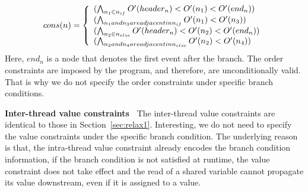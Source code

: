 \[ cons(n) = \left\{ 
  \begin{array}{l l}
  (\bigwedge_{n_1\in n_{if}}{O'(header_n)<O'(n_1)<O'(end_n)}) \\
   (\bigwedge_{n_1 and n_3 are adjacent in n_{if}}{O'(n_1)<O'(n_3)}) \\
   (\bigwedge_{n_2\in n_{else}}{O'(header_n)<O'(n_2)<O'(end_n)}) \\
    (\bigwedge_{n_2 and n_4 are adjacent in n_{else}}{O'(n_2)<O'(n_4)}) \\
  \end{array} \right.\]
Here, $end_n$ is a node that denotes the first event after the branch.  The order constraints are imposed by the program, and therefore, are unconditionally valid. That is why we do not specify the order constraints under specific branch conditions. 

{\bf Inter-thread value constraints\ } The inter-thread value constraints are identical to those in Section~\ref{sec:relax1}. Interesting, we do not need to specify the value constraints under the specific branch condition. The underlying reason is that, the intra-thread value constraint already encodes the branch condition information, if the branch condition is not satisfied at runtime, the value constraint does not take effect and the read of a shared variable cannot propagate its value downstream, even if it is assigned to a value. 





